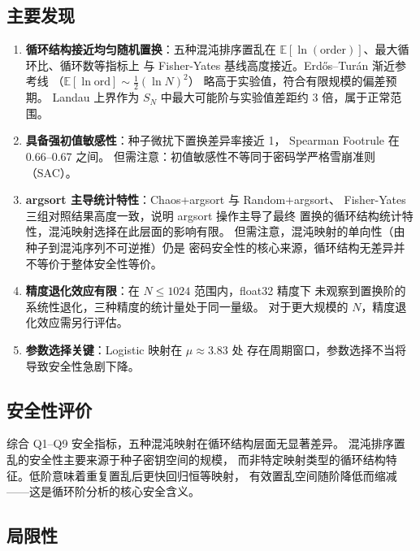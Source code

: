 \documentclass[12pt,a4paper]{ctexrep}
\begin{document}
\subsection*{主要发现}

\begin{enumerate}
  \item \textbf{循环结构接近均匀随机置换}：五种混沌排序置乱在
  $\mathbb{E}[\ln(\text{order})]$、最大循环比、循环数等指标上
  与 Fisher-Yates 基线高度接近。Erdős--Turán 渐近参考线
  （$\mathbb{E}[\ln \mathrm{ord}] \sim \frac{1}{2}(\ln N)^2$）
  略高于实验值，符合有限规模的偏差预期。
  Landau 上界作为 $S_N$ 中最大可能阶与实验值差距约 3 倍，属于正常范围。
  
  \item \textbf{具备强初值敏感性}：种子微扰下置换差异率接近 1，
  Spearman Footrule 在 0.66--0.67 之间。
  但需注意：初值敏感性不等同于密码学严格雪崩准则（SAC）。
  
  \item \textbf{argsort 主导统计特性}：Chaos+argsort 与 Random+argsort、
  Fisher-Yates 三组对照结果高度一致，说明 argsort 操作主导了最终
  置换的循环结构统计特性，混沌映射选择在此层面的影响有限。
  但需注意，混沌映射的单向性（由种子到混沌序列不可逆推）仍是
  密码安全性的核心来源，循环结构无差异并不等价于整体安全性等价。
  
  \item \textbf{精度退化效应有限}：在 $N\leq 1024$ 范围内，float32 精度下
  未观察到置换阶的系统性退化，三种精度的统计量处于同一量级。
  对于更大规模的 $N$，精度退化效应需另行评估。
  
  \item \textbf{参数选择关键}：Logistic 映射在 $\mu \approx 3.83$ 处
  存在周期窗口，参数选择不当将导致安全性急剧下降。
\end{enumerate}

\subsection*{安全性评价}

综合 Q1--Q9 安全指标，五种混沌映射在循环结构层面无显著差异。
混沌排序置乱的安全性主要来源于种子密钥空间的规模，
而非特定映射类型的循环结构特征。低阶意味着重复置乱后更快回归恒等映射，
有效置乱空间随阶降低而缩减——这是循环阶分析的核心安全含义。

\subsection*{局限性}
\end{document}
